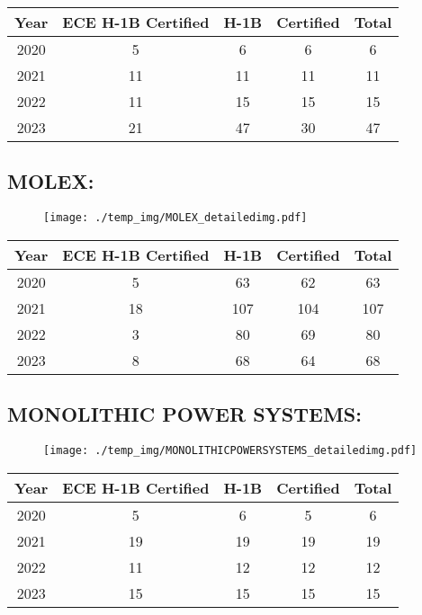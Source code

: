 \documentclass{article}%
\begin{document}
%
\begin{longtable}{c|c|c|c|c}%
\hline%
Year&ECE H{-}1B Certified&H{-}1B&Certified&Total\\%
\hline%
2020&5&6&6&6\\%
\hline%
2021&11&11&11&11\\%
\hline%
2022&11&15&15&15\\%
\hline%
2023&21&47&30&47\\%
\hline%
\end{longtable}

%
\newpage%
\subsection{MOLEX:}%
\label{subsec:MOLEX}%
\label{MOLEXdetailed}%


\begin{figure}[htbp]%
\centering%
\texttt{[image: ./temp\_img/MOLEX\_detailedimg.pdf]}%
\end{figure}

%
\begin{longtable}{c|c|c|c|c}%
\hline%
Year&ECE H{-}1B Certified&H{-}1B&Certified&Total\\%
\hline%
2020&5&63&62&63\\%
\hline%
2021&18&107&104&107\\%
\hline%
2022&3&80&69&80\\%
\hline%
2023&8&68&64&68\\%
\hline%
\end{longtable}

%
\newpage%
\subsection{MONOLITHIC POWER SYSTEMS:}%
\label{subsec:MONOLITHICPOWERSYSTEMS}%
\label{MONOLITHICPOWERSYSTEMSdetailed}%


\begin{figure}[htbp]%
\centering%
\texttt{[image: ./temp\_img/MONOLITHICPOWERSYSTEMS\_detailedimg.pdf]}%
\end{figure}

%
\begin{longtable}{c|c|c|c|c}%
\hline%
Year&ECE H{-}1B Certified&H{-}1B&Certified&Total\\%
\hline%
2020&5&6&5&6\\%
\hline%
2021&19&19&19&19\\%
\hline%
2022&11&12&12&12\\%
\hline%
2023&15&15&15&15\\%
\hline%
\end{longtable}
\end{document}
